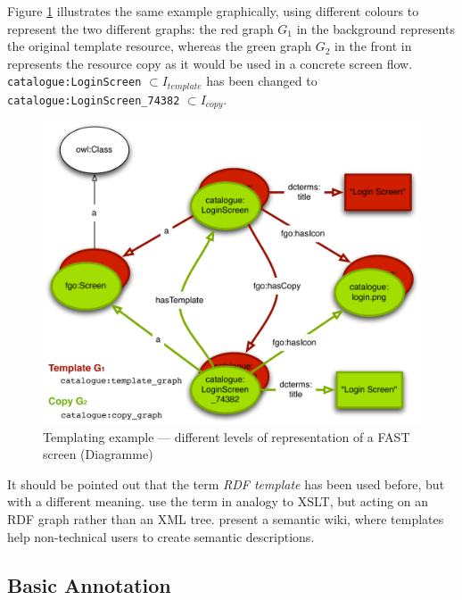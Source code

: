 \documentclass[twoside]{fast_latex}
\begin{document}
\singlespacing
{}
\begin{figure}[ht]
	
\end{figure}
\doublespacing

Figure \ref{fig:templating_example_graph} illustrates the same example graphically, using different colours to represent the two different graphs: the red graph $G_1$ in the background represents the original template resource, whereas the green graph $G_2$ in the front in represents the resource copy as it would be used in a concrete screen flow. \texttt{catalogue:LoginScreen} $\subset I_{template}$ has been changed to \texttt{catalogue:LoginScreen\_74382} $\subset I_{copy}$.

\begin{figure}[ht]
  \begin{center}
    \includegraphics[width=.75\linewidth]{images/templating_example.pdf}
    \caption{Templating example --- different levels of representation of a FAST screen (Diagramme)}
    \label{fig:templating_example_graph}
  \end{center}
\end{figure}


It should be pointed out that the term \emph{RDF template} has been used before, but with a different meaning. \cite{davis2003rdf_template} use the term in analogy to XSLT, but acting on an RDF graph rather than an XML tree. \cite{kawamoto2006kawawiki} present a semantic wiki, where templates help non-technical users to create semantic descriptions. 

\subsection{Basic Annotation} %
\label{sub:basic_annotation}
\end{document}
